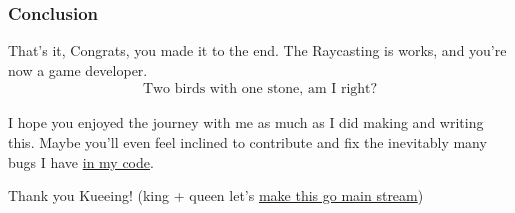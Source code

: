 \subsubsection{Conclusion}

That's it, Congrats, you made it to the end. The Raycasting is works, and you're now a game developer.
\begin{align*}
    \text{Two  birds with one stone, am I right?}
\end{align*}

I hope you enjoyed the journey with me as much as I did making and writing this. Maybe you'll even feel inclined to contribute and fix the inevitably many bugs I have \href{https://github.com//korigamik/untitledpsp}{in my code}.

Thank you Kueeing! (king + queen let's \href{https://www.urbandictionary.com/define.php?term=kueeing}{make this go main stream})

\newpage

